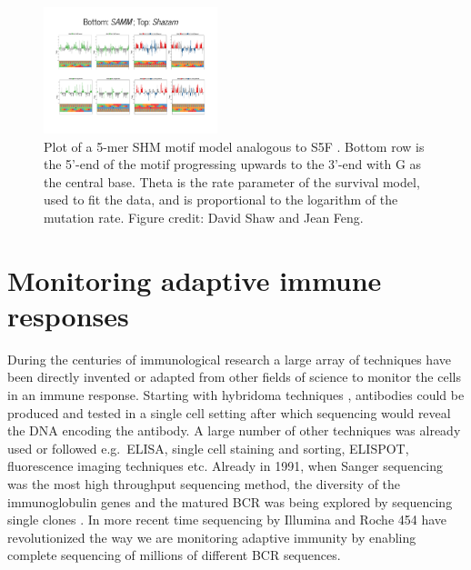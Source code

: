 \begin{figure}[!ht]
    \centering
    \includegraphics[width=0.45\textwidth]{figures/SAMM_plot.pdf}
    \caption{
        \label{fig:SAMM_plot}
        Plot of a 5-mer SHM motif model analogous to S5F \cite{cui2016model}. Bottom row is the 5'-end of the motif progressing upwards to the 3'-end with G as the central base. Theta is the rate parameter of the survival model, used to fit the data, and is proportional to the logarithm of the mutation rate.
        Figure credit: David Shaw and Jean Feng.
    }
\end{figure}










\section{Monitoring adaptive immune responses}
During the centuries of immunological research a large array of techniques have been directly invented or adapted from other fields of science to monitor the cells in an immune response.
Starting with hybridoma techniques \cite{larrick1989polymemse}, antibodies could be produced and tested in a single cell setting after which sequencing would reveal the DNA encoding the antibody.
A large number of other techniques was already used or followed e.g.\ ELISA, single cell staining and sorting, ELISPOT, fluorescence imaging techniques etc.
Already in 1991, when Sanger sequencing was the most high throughput sequencing method, the diversity of the immunoglobulin genes and the matured BCR was being explored by sequencing single clones \cite{yamada1991preferential}.
In more recent time sequencing by Illumina and Roche 454 have revolutionized the way we are monitoring adaptive immunity by enabling complete sequencing of millions of different BCR sequences.


